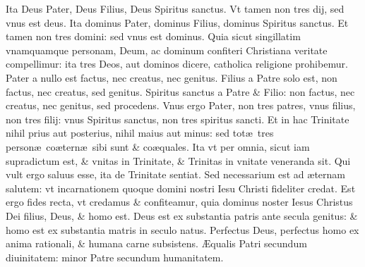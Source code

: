 \documentclass[a5paper,10pt]{book}
\def\ae{æ}
\def\AE{Æ}
\begin{document}
\begin{multicols*}{2}
\newline \color{red} I\color{black}ta Deus Pater, Deus Filius, Deus Spiritus sanctus.
\newline \color{red} V\color{black}t tamen non tres dij, sed vnus est deus.
\newline \color{red} I\color{black}ta dominus Pater, dominus Filius, dominus Spiritus sanctus.
\newline \color{red} E\color{black}t tamen non tres domini: sed vnus est dominus.
\newline \color{red} Q\color{black}uia sicut singillatim vnamquamque personam, Deum, ac dominum confiteri Christiana veritate compellimur: ita tres Deos, aut dominos dicere, catholica religione prohibemur.%
\newline \color{red} P\color{black}ater a nullo est factus, nec creatus, nec genitus.
\newline \color{red} F\color{black}ilius a Patre solo est, non factus, nec creatus, sed genitus.
\newline \color{red} S\color{black}piritus sanctus a Patre \& Filio: non factus, nec creatus, nec genitus, sed procedens.
\newline \color{red} V\color{black}nus ergo Pater, non tres patres, vnus filius, non tres filij: vnus Spiritus sanctus, non tres spiritus sancti.
\newline \color{red} E\color{black}t in hac Trinitate nihil prius aut posterius, nihil maius aut minus: sed tot\ae \ tres person\ae \ co\ae tern\ae \ sibi sunt \& co\ae quales.
\newline \color{red} I\color{black}ta vt per omnia, sicut iam supradictum est, \& vnitas in Trinitate, \& Trinitas in vnitate veneranda sit.
\newline \color{red} Q\color{black}ui vult ergo saluus esse, ita de Trinitate sentiat.
\newline \color{red} S\color{black}ed necessarium est ad \ae ternam salutem: vt incarnationem quoque domini nostri Iesu Christi fideliter credat.
\newline \color{red} E\color{black}st ergo fides recta, vt credamus \& confiteamur, quia dominus noster Iesus Christus Dei filius, Deus, \& homo est.
\newline \color{red} D\color{black}eus est ex substantia patris ante secula genitus: \& homo est ex substantia matris in seculo natus.
\newline \color{red} P\color{black}erfectus Deus, perfectus homo ex anima rationali, \& humana carne subsistens.
\newline \color{red} \AE \color{black}qualis Patri secundum diuinitatem: minor Patre secundum humanitatem.

\end{multicols*}
\end{document}
